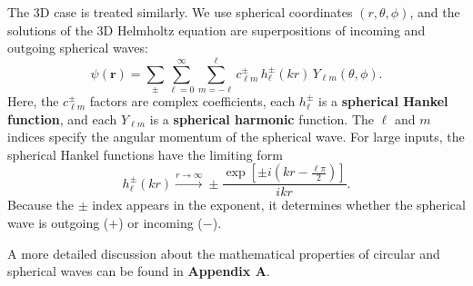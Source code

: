 \documentclass[pra,12pt]{revtex4}
\begin{document}
The 3D case is treated similarly.  We use spherical coordinates
$(r,\theta,\phi)$, and the solutions of the 3D Helmholtz equation are
superpositions of incoming and outgoing spherical waves:
\begin{equation}
  \psi(\mathbf{r})=\sum_{\pm}\sum_{\ell=0}^\infty\sum_{m=-\ell}^\ell c_{\ell m}^\pm \,
  h_\ell^\pm(kr)\,Y_{\ell m}(\theta,\phi).
\end{equation}
Here, the $c_{\ell m}^\pm$ factors are complex coefficients, each
$h_\ell^\pm$ is a \textbf{spherical Hankel function}, and each
$Y_{\ell m}$ is a \textbf{spherical harmonic} function.  The $\ell$
and $m$ indices specify the angular momentum of the spherical wave.
For large inputs, the spherical Hankel functions have the limiting
form
\begin{equation}
  h_\ell^\pm(kr) \overset{r\rightarrow\infty}{\longrightarrow} \pm \frac{\exp\!\left[\pm i\!\left(kr-\frac{\ell\pi}{2}\right)\right]}{ikr}.
\end{equation}
Because the $\pm$ index appears in the exponent, it determines whether
the spherical wave is outgoing ($+$) or incoming ($-$).

A more detailed discussion about the mathematical properties of
circular and spherical waves can be found in \textbf{Appendix A}.
\end{document}
